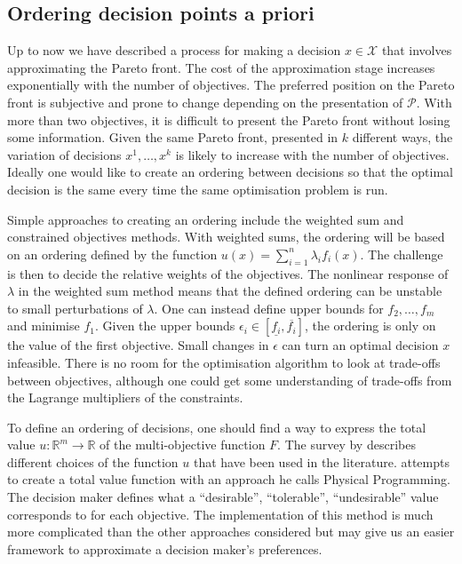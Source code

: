 \documentclass[main.tex]{subfiles}
\begin{document}
\subsection{Ordering decision points a priori}\label{sec:multi_apriori}
Up to now we have described a process for making a decision
$x\in\mathcal{X}$ that involves approximating the Pareto
front.
The cost of the approximation stage increases exponentially with the
number of objectives. The preferred position on the Pareto front is
subjective and prone to change depending on the presentation of
$\mathcal{P}$. With more than two objectives, it is difficult to
present the Pareto front without losing some information.
Given the same Pareto front, presented in
$k$ different ways, the variation of decisions $x^1,\dots,x^k$ is likely to
increase with the number of objectives.
Ideally one would like to create an ordering between decisions so
that the optimal decision is the same every time the same optimisation
problem is run.

Simple approaches to creating an ordering include the weighted sum
and constrained objectives methods.
With weighted sums, the ordering will be based on
an ordering defined by the function $u(x)=\sum_{i=1}^n\lambda_if_i(x)$.
The challenge is then to decide the relative weights of the objectives. The
nonlinear response of $\lambda$ in the weighted sum method means that
the defined ordering can be unstable to small perturbations of $\lambda$.
One can instead define upper bounds for $f_2,\dots,f_m$ and minimise
$f_1$.
Given the upper bounds
$\epsilon_i\in[\underline{f_i},\overline{f_i}]$,
the ordering is only on the value of the first objective.
Small changes in $\epsilon$ can turn an optimal decision $x$
infeasible. There is no room for the optimisation algorithm to
look at trade-offs between objectives, although one could get some
understanding of trade-offs from the
Lagrange multipliers of the constraints.

To define an ordering of decisions, one should find a way to express
the total value $u:\mathbb{R}^m\to\mathbb{R}$ of the multi-objective
function $F$. The survey by \citet{marler2004survey} describes
different choices of the function $u$ that have been used in the literature.
\citet{messac1996physical} attempts to create a total value function
with an approach he calls Physical Programming. The decision
maker defines what a ``desirable'', ``tolerable'',
``undesirable'' value corresponds to for each objective. The implementation of this method
is much more complicated than the other approaches considered but
may give us an easier framework to approximate a decision maker's preferences.
\end{document}
